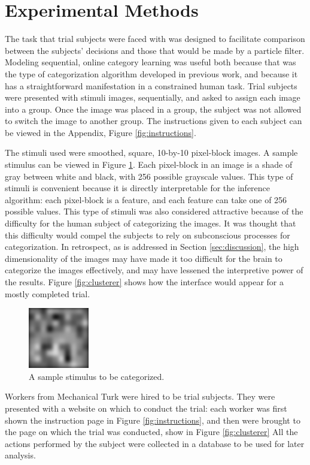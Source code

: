 \section{Experimental Methods}
\label{sec:experiment}
The task that trial subjects were faced with was designed to facilitate
comparison between the subjects' decisions and those that would be made by a
particle filter. Modeling sequential, online category learning was useful both
because that was the type of categorization algorithm developed in previous
work, and because it has a straightforward manifestation in a constrained human
task. Trial subjects were presented with stimuli images, sequentially, and asked
to assign each image into a group. Once the image was placed in a group, the
subject was not allowed to switch the image to another group. The instructions
given to each subject can be viewed in the Appendix, Figure
\ref{fig:instructions}.

The stimuli used were smoothed, square, 10-by-10 pixel-block images. A sample
stimulus can be viewed in Figure \ref{fig:stimulus}. Each pixel-block in an
image is a shade of gray between white and black, with 256 possible grayscale
values. This type of stimuli is convenient because it is directly interpretable
for the inference algorithm: each pixel-block is a feature, and each feature can
take one of 256 possible values. This type of stimuli was also considered
attractive because of the difficulty for the human subject of categorizing the
images. It was thought that this difficulty would compel the subjects to rely on
subconscious processes for categorization. In retrospect, as is addressed in
Section \ref{sec:discussion}, the high dimensionality of the images may have
made it too difficult for the brain to categorize the images effectively, and
may have lessened the interpretive power of the results. Figure
\ref{fig:clusterer} shows how the interface would appear for a mostly completed trial.

\begin{figure}
\centering
\includegraphics[scale=1]{img/stimulus.png}
\caption{A sample stimulus to be categorized.}
\label{fig:stimulus}
\end{figure}

Workers from Mechanical Turk were hired to be trial subjects. They were presented
with a website on which to conduct the trial: each worker was first shown the
instruction page in Figure \ref{fig:instructions}, and then were brought to the
page on which the trial was conducted, show in Figure \ref{fig:clusterer}  All
the actions performed by the subject were collected in a database to be used for
later analysis.

